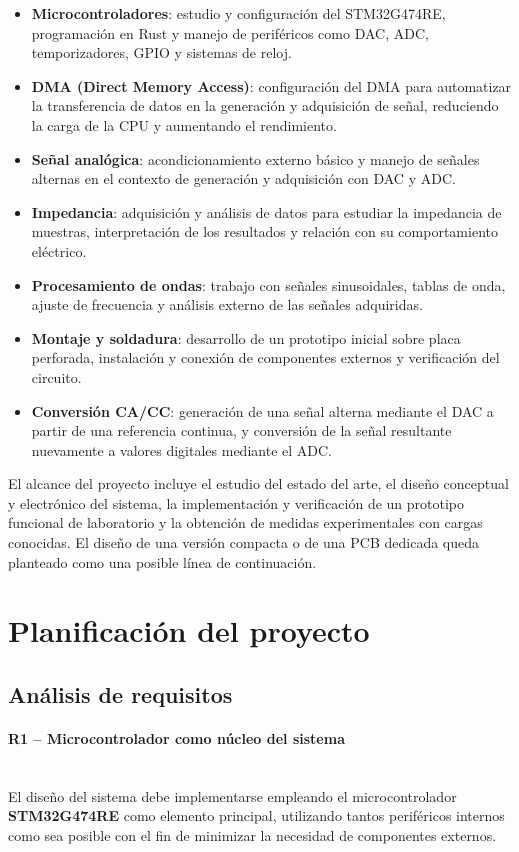 \documentclass[11pt,a4paper]{article}
\newcommand{\myparagraph}[1]{\paragraph{#1}\mbox{}\\}
\begin{document}
\begin{itemize}
    \item \textbf{Microcontroladores}: estudio y configuración del STM32G474RE, programación en Rust y manejo de periféricos como DAC, ADC, temporizadores, GPIO y sistemas de reloj.
    \item \textbf{DMA (Direct Memory Access)}: configuración del DMA para automatizar la transferencia de datos en la generación y adquisición de señal, reduciendo la carga de la CPU y aumentando el rendimiento.
    \item \textbf{Señal analógica}: acondicionamiento externo básico y manejo de señales alternas en el contexto de generación y adquisición con DAC y ADC.
    \item \textbf{Impedancia}: adquisición y análisis de datos para estudiar la impedancia de muestras, interpretación de los resultados y relación con su comportamiento eléctrico.
    \item \textbf{Procesamiento de ondas}: trabajo con señales sinusoidales, tablas de onda, ajuste de frecuencia y análisis externo de las señales adquiridas.
    \item \textbf{Montaje y soldadura}: desarrollo de un prototipo inicial sobre placa perforada, instalación y conexión de componentes externos y verificación del circuito.
    \item \textbf{Conversión CA/CC}: generación de una señal alterna mediante el DAC a partir de una referencia continua, y conversión de la señal resultante nuevamente a valores digitales mediante el ADC.
\end{itemize}

El alcance del proyecto incluye el estudio del estado del arte, el diseño conceptual y electrónico del sistema, la implementación y verificación de un prototipo funcional de laboratorio y la obtención de medidas experimentales con cargas conocidas. El diseño de una versión compacta o de una PCB dedicada queda planteado como una posible línea de continuación.

\section{Planificación del proyecto}
\subsection{Análisis de requisitos}

\myparagraph{R1 – Microcontrolador como núcleo del sistema}
El diseño del sistema debe implementarse empleando el microcontrolador \textbf{STM32G474RE} como elemento principal, utilizando tantos periféricos internos como sea posible con el fin de minimizar la necesidad de componentes externos.
\end{document}

